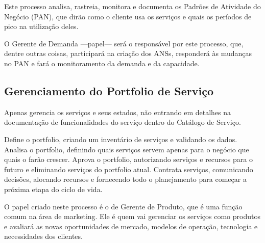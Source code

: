 Este processo analisa, rastreia, monitora e documenta os Padrões de Atividade
do Negócio (PAN), que dirão como o cliente usa os serviços e quais os períodos
de pico na utilização deles.
%

O Gerente de Demanda ---papel--- será o responsável por este processo, que,
dentre outras coisas, participará na criação dos ANSs, responderá às mudanças
no PAN e fará o monitoramento da demanda e da capacidade.


\subsection{Gerenciamento do Portfolio de Serviço}
Apenas gerencia os serviços e seus estados, não entrando em detalhes na
documentação de funcionalidades do serviço dentro do Catálogo de Serviço.

Define o portfolio, criando um inventário de serviços e validando os dados.
Analisa o portfolio, definindo quais serviços servem apenas para o negócio que
quais o farão crescer. Aprova o portfolio, autorizando serviços e recursos para
o futuro e eliminando serviços do portfolio atual. Contrata serviços,
comunicando decisões, alocando recursos e fornecendo todo o planejamento para
começar a próxima etapa do ciclo de vida.

O papel criado neste processo é o de Gerente de Produto, que é uma função comum
na área de marketing. Ele é quem vai gerenciar os serviços como produtos e
avaliará as novas oportunidades de mercado, modelos de operação, tecnologia e
necessidades dos clientes.
